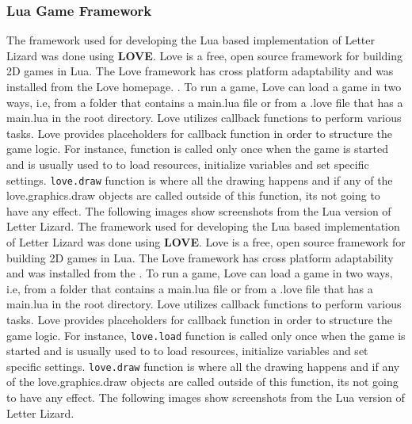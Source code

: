 \subsubsection{Lua Game Framework}
The framework used for developing the Lua based implementation of Letter Lizard was done using \textbf{LOVE}. Love is a free, open source framework for building 2D games in Lua. The Love framework has cross platform adaptability and was installed from the Love homepage. \cite{about_love}. To run a game, Love can load a game in two ways, i.e, from a folder that contains a main.lua file or from a .love file that has a main.lua in the root directory. Love utilizes callback functions to perform various tasks. Love provides placeholders for callback function in order to structure the game logic. For instance,  function is called only once when the game is started and is usually used to to load resources, initialize variables and set specific settings. \texttt{love.draw} function is where all the drawing happens and if any of the love.graphics.draw objects are called outside of this function, its not going to have any effect. The following images show screenshots from the Lua version of Letter Lizard.
The framework used for developing the Lua based implementation of Letter Lizard was done using \textbf{LOVE}. Love is a free, open source framework for building 2D games in Lua. The Love framework has cross platform adaptability and was installed from the \cite{about_love}. To run a game, Love can load a game in two ways, i.e, from a folder that contains a main.lua file or from a .love file that has a main.lua in the root directory. Love utilizes callback functions to perform various tasks. Love provides placeholders for callback function in order to structure the game logic. For instance, \texttt{love.load} function is called only once when the game is started and is usually used to to load resources, initialize variables and set specific settings. \texttt{love.draw} function is where all the drawing happens and if any of the love.graphics.draw objects are called outside of this function, its not going to have any effect. The following images show screenshots from the Lua version of Letter Lizard.
